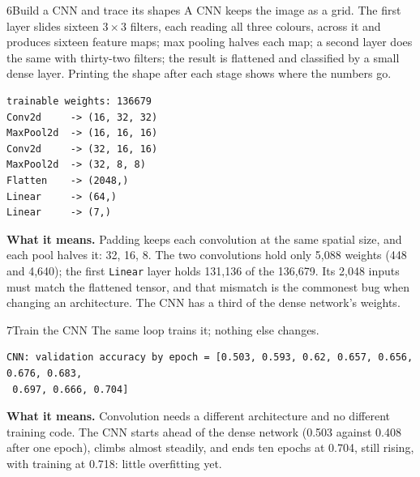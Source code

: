 
\begin{labquestion}{6}{Build a CNN and trace its shapes}
A CNN keeps the image as a grid. The first layer slides sixteen $3\times3$ filters, each reading all three colours, across it and produces sixteen feature maps; max pooling halves each map; a second layer does the same with thirty-two filters; the result is flattened and classified by a small dense layer. Printing the shape after each stage shows where the numbers go.
\end{labquestion}
\begin{labanswer}


\begin{refoutput}
\begin{lstlisting}[style=utpterminal]
trainable weights: 136679
Conv2d     -> (16, 32, 32)
MaxPool2d  -> (16, 16, 16)
Conv2d     -> (32, 16, 16)
MaxPool2d  -> (32, 8, 8)
Flatten    -> (2048,)
Linear     -> (64,)
Linear     -> (7,)
\end{lstlisting}
\end{refoutput}

\textbf{What it means.} Padding keeps each convolution at the same spatial size, and each pool halves it: 32, 16, 8. The two convolutions hold only 5,088 weights (448 and 4,640); the first \texttt{Linear} layer holds 131,136 of the 136,679. Its 2,048 inputs must match the flattened tensor, and that mismatch is the commonest bug when changing an architecture. The CNN has a third of the dense network's weights.
\end{labanswer}

\begin{labquestion}{7}{Train the CNN}
The same loop trains it; nothing else changes.
\end{labquestion}
\begin{labanswer}

\begin{refoutput}
\begin{lstlisting}[style=utpterminal]
CNN: validation accuracy by epoch = [0.503, 0.593, 0.62, 0.657, 0.656, 0.676, 0.683,
 0.697, 0.666, 0.704]
\end{lstlisting}
\end{refoutput}

\textbf{What it means.} Convolution needs a different architecture and no different training code. The CNN starts ahead of the dense network (0.503 against 0.408 after one epoch), climbs almost steadily, and ends ten epochs at 0.704, still rising, with training at 0.718: little overfitting yet.
\end{labanswer}

